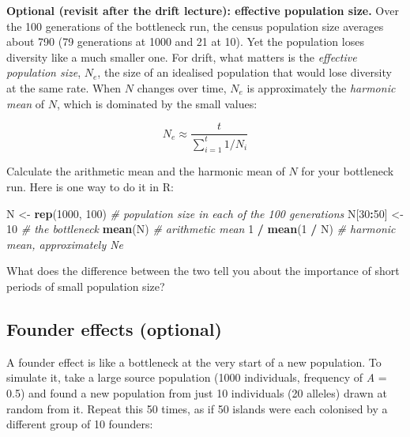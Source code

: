 \documentclass[
  a4paper]{book}
\newenvironment{Shaded}{\begin{snugshade}}{\end{snugshade}}
\newcommand{\CommentTok}[1]{\textcolor[rgb]{0.56,0.35,0.01}{\textit{#1}}}
\newcommand{\DecValTok}[1]{\textcolor[rgb]{0.00,0.00,0.81}{#1}}
\newcommand{\FunctionTok}[1]{\textcolor[rgb]{0.13,0.29,0.53}{\textbf{#1}}}
\newcommand{\NormalTok}[1]{#1}
\newcommand{\OtherTok}[1]{\textcolor[rgb]{0.56,0.35,0.01}{#1}}
\newcommand{\SpecialCharTok}[1]{\textcolor[rgb]{0.81,0.36,0.00}{\textbf{#1}}}
\begin{document}
\textbf{Optional (revisit after the drift lecture): effective population size.} Over the 100 generations of the bottleneck run, the census population size averages about 790 (79 generations at 1000 and 21 at 10). Yet the population loses diversity like a much smaller one. For drift, what matters is the \emph{effective population size}, \(N_e\), the size of an idealised population that would lose diversity at the same rate. When \(N\) changes over time, \(N_e\) is approximately the \emph{harmonic mean} of \(N\), which is dominated by the small values:

\[N_e \approx \frac{t}{\sum_{i=1}^{t} 1/N_i}\]

Calculate the arithmetic mean and the harmonic mean of \(N\) for your bottleneck run. Here is one way to do it in R:

\begin{Shaded}
\begin{Highlighting}[]
\NormalTok{N }\OtherTok{\textless{}{-}} \FunctionTok{rep}\NormalTok{(}\DecValTok{1000}\NormalTok{, }\DecValTok{100}\NormalTok{)    }\CommentTok{\# population size in each of the 100 generations}
\NormalTok{N[}\DecValTok{30}\SpecialCharTok{:}\DecValTok{50}\NormalTok{] }\OtherTok{\textless{}{-}} \DecValTok{10}         \CommentTok{\# the bottleneck}
\FunctionTok{mean}\NormalTok{(N)                }\CommentTok{\# arithmetic mean}
\DecValTok{1} \SpecialCharTok{/} \FunctionTok{mean}\NormalTok{(}\DecValTok{1} \SpecialCharTok{/}\NormalTok{ N)        }\CommentTok{\# harmonic mean, approximately Ne}
\end{Highlighting}
\end{Shaded}

What does the difference between the two tell you about the importance of short periods of small population size?

\subsection{Founder effects (optional)}\label{founder-effects-optional}

A founder effect is like a bottleneck at the very start of a new population. To simulate it, take a large source population (1000 individuals, frequency of \emph{A} = 0.5) and found a new population from just 10 individuals (20 alleles) drawn at random from it. Repeat this 50 times, as if 50 islands were each colonised by a different group of 10 founders:
\end{document}
